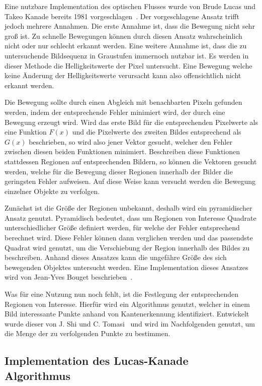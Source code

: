 Eine nutzbare Implementation des optischen Flusses wurde von Brude Lucas und Takeo Kanade bereits 1981 vorgeschlagen~\cite{Lucas1981}.
Der vorgeschlagene Ansatz trifft jedoch mehrere Annahmen.
Die erste Annahme ist, dass die Bewegung nicht sehr gro{\ss} ist.
Zu schnelle Bewegungen können durch diesen Ansatz wahrscheinlich nicht oder nur schlecht erkannt werden.
Eine weitere Annahme ist, dass die zu untersuchende Bildsequenz in Graustufen immernoch nutzbar ist.
Es werden in dieser Methode die Helligkeitswerte der Pixel untersucht.
Eine Bewegung welche keine Änderung der Helligkeitswerte verursacht kann also offensichtlich nicht erkannt werden.

Die Bewegung sollte durch einen Abgleich mit benachbarten Pixeln gefunden werden, indem der entsprechende Fehler minimiert wird, der durch eine Bewegung erzeugt wird.
Wird das erste Bild für die entsprechenden Pixelwerte als eine Funktion $F(x)$ und die Pixelwerte des zweiten Bildes entsprechend als $G(x)$ beschrieben, so wird also jener Vektor gesucht, welcher den Fehler zwischen diesen beiden Funktionen minimiert.
Beschreiben diese Funktionen stattdessen Regionen auf entsprechenden Bildern, so können die Vektoren gesucht werden, welche für die Bewegung dieser Regionen innerhalb der Bilder die geringsten Fehler aufweisen.
Auf diese Weise kann versucht werden die Bewegung einzelner Objekte zu verfolgen.

Zunächst ist die Grö{\ss}e der Regionen unbekannt, deshalb wird ein pyramidischer Ansatz genutzt.
Pyramidisch bedeutet, dass um Regionen von Interesse Quadrate unterschiedlicher Grö{\ss}e definiert werden, für welche der Fehler entsprechend berechnet wird.
Diese Fehler können dann verglichen werden und das passendste Quadrat wird genutzt, um die Verschiebung der Region innerhalb des Bildes zu beschreiben.
Anhand dieses Ansatzes kann die ungefähre Grö{\ss}e des sich bewegenden Objektes untersucht werden.
Eine Implementation dieses Ansatzes wird von Jean-Yves Bouget beschrieben~\cite{Bouguet2000}.

Was für eine Nutzung nun noch fehlt, ist die Festlegung der entsprechenden Regionen von Interesse.
Hierfür wird ein Algorithmus genutzt, welcher in einem Bild interessante Punkte anhand von Kantenerkennung identifiziert.
Entwickelt wurde dieser von J. Shi und C. Tomasi~\cite{Shi1994} und wird im Nachfolgenden genutzt, um die Menge der zu verfolgenden Punkte zu bestimmen.

\subsection{Implementation des Lucas-Kanade Algorithmus}


